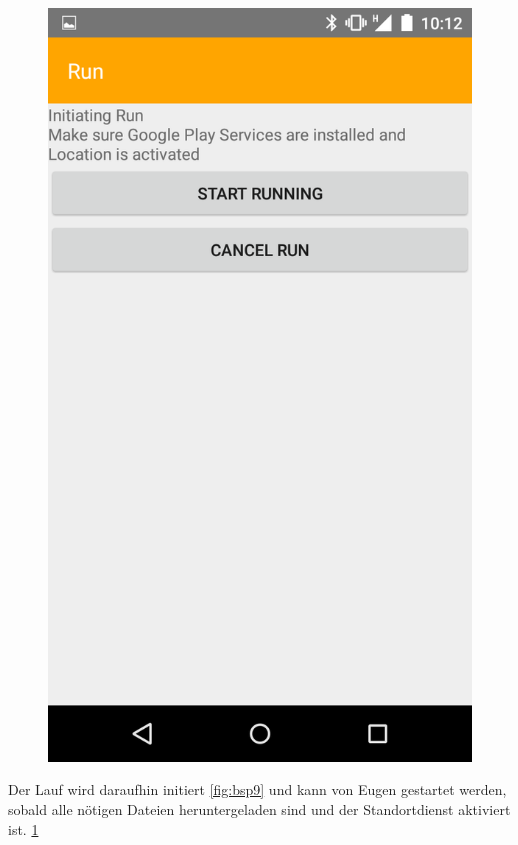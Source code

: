 \begin{figure}
\begin{minipage}{.4\textwidth}
  \includegraphics[width=.8\linewidth]{abb/bsp/bsp10}
  \label{fig:bsp10}
\end{minipage}
\end{figure}

Der Lauf wird daraufhin initiert \ref{fig:bsp9} und kann von Eugen gestartet werden, sobald alle nötigen Dateien heruntergeladen sind und der Standortdienst aktiviert ist. \ref{fig:bsp10}

